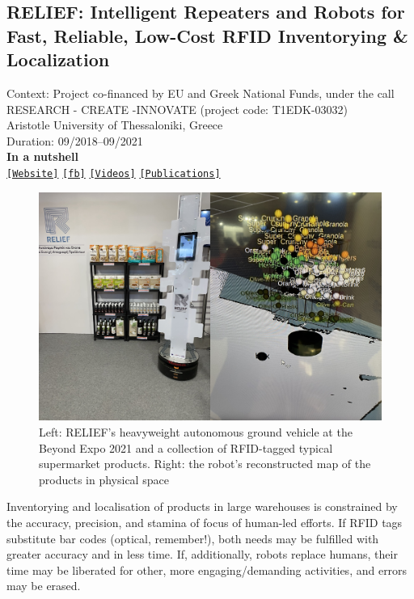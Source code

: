 \subsection{RELIEF: Intelligent Repeaters and Robots for Fast, Reliable, Low-Cost RFID Inventorying \& Localization}

\noindent Context: Project co-financed by EU and Greek National Funds, under the call RESEARCH - CREATE -INNOVATE (project code: T1EDK-03032)\\
\noindent Aristotle University of Thessaloniki, Greece\\
\noindent Duration: 09/2018--09/2021\\

\noindent \textbf{In a nutshell}\\
\noindent \href{http://relief.web.auth.gr/language/en/home/}{\texttt{[Website]}} \href{https://www.facebook.com/ReliefAuth}{\texttt{[fb]}} \href{https://www.youtube.com/@antonidimi/search?query=relief}{\texttt{[Videos]}} \href{https://relief.web.auth.gr/language/en/publications/}{\texttt{[Publications]}} \\


\begin{figure}[H]\centering
  \includegraphics[scale=0.4]{images/relief_1.png}
  \caption{\small Left: RELIEF's heavyweight autonomous ground vehicle at the
           Beyond Expo 2021 and a collection of RFID-tagged typical supermarket
           products. Right: the robot's reconstructed map of
           the products in physical space}
  \label{fig:relief_beyond_1}
\end{figure}

Inventorying and localisation of products in large warehouses is constrained by
the accuracy, precision, and stamina of focus of human-led efforts. If RFID
tags substitute bar codes (optical, remember!), both needs may be fulfilled
with greater accuracy and in less time. If, additionally, robots replace
humans, their time may be liberated for other, more engaging/demanding
activities, and errors may be erased.

